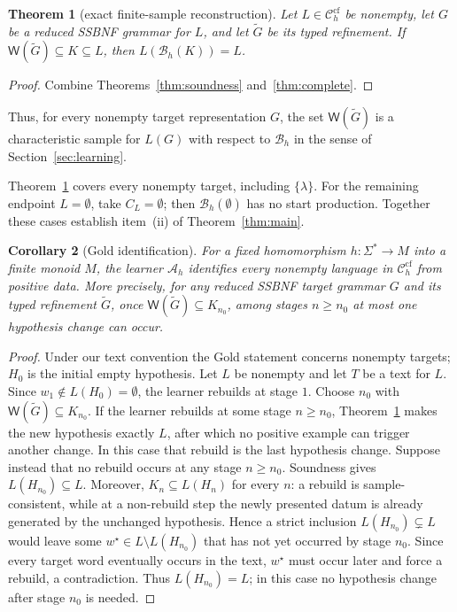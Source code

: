 \documentclass[11pt,a4paper]{article}
\newtheorem{theorem}{Theorem}[section]
\newtheorem{corollary}[theorem]{Corollary}
\theoremstyle{remark}
\theoremstyle{plain}
\newcommand{\WitnessSet}{\mathsf{W}}
\newcommand{\cf}{\mathrm{cf}}
\newcommand{\Ccf}[1]{\mathcal C_{#1}^{\cf}}
\begin{document}
\begin{theorem}[exact finite-sample reconstruction]
\label{thm:reconstruction-fixed-h}
Let $L\in\Ccf{h}$ be nonempty, let $G$ be a reduced SSBNF grammar for $L$,
and let $\widetilde G$ be its typed refinement.  If
$\WitnessSet(\widetilde G)\subseteq K\subseteq L$, then $L(\mathcal B_h(K))=L$.
\end{theorem}
\begin{proof}
Combine Theorems~\ref{thm:soundness} and~\ref{thm:complete}.
\end{proof}

Thus, for every nonempty target representation $G$, the set
$\WitnessSet(\widetilde G)$ is a characteristic sample for $L(G)$
with respect to $\mathcal B_h$ in the sense of Section~\ref{sec:learning}.

Theorem~\ref{thm:reconstruction-fixed-h} covers every nonempty target,
including $\{\lambda\}$.  For the remaining endpoint $L=\emptyset$, take
$C_L=\emptyset$; then $\mathcal B_h(\emptyset)$ has no start production.
Together these cases establish item~(ii) of Theorem~\ref{thm:main}.

\begin{corollary}[Gold identification]\label{cor:ilt}
For a fixed homomorphism $h:\Sigma^*\to M$ into a finite monoid $M$, the learner
$\mathcal A_h$ identifies every nonempty language in $\Ccf{h}$ from positive data.  More precisely, for any reduced SSBNF target
grammar $G$ and its typed refinement $\widetilde G$, once
$\WitnessSet(\widetilde G)\subseteq K_{n_0}$, among stages $n\ge n_0$ at most one hypothesis change
can occur.
\end{corollary}

\begin{proof}
Under our text convention the Gold statement concerns nonempty targets;
$H_0$ is the initial empty hypothesis.  Let $L$ be nonempty and let $T$ be a
text for $L$.  Since $w_1\notin L(H_0)=\emptyset$, the learner rebuilds at
stage $1$.  Choose $n_0$ with
$\WitnessSet(\widetilde G)\subseteq K_{n_0}$.  If the learner rebuilds at
some stage $n\ge n_0$, Theorem~\ref{thm:reconstruction-fixed-h} makes the
new hypothesis exactly $L$, after which no positive example can trigger
another change.  In this case that rebuild is the last hypothesis change.
Suppose instead that no rebuild occurs at any stage $n\ge n_0$.  Soundness
gives $L(H_{n_0})\subseteq L$.  Moreover, $K_n\subseteq L(H_n)$ for every
$n$: a rebuild is sample-consistent, while at a non-rebuild step the newly
presented datum is already generated by the unchanged hypothesis.  Hence a
strict inclusion $L(H_{n_0})\subsetneq L$ would leave some
$w^\star\in L\setminus L(H_{n_0})$ that has not yet occurred by stage
$n_0$.  Since every target word eventually occurs in the text, $w^\star$
must occur later and force a rebuild, a contradiction.  Thus
$L(H_{n_0})=L$; in this case no hypothesis change after stage $n_0$ is
needed.
\end{proof}
\end{document}
